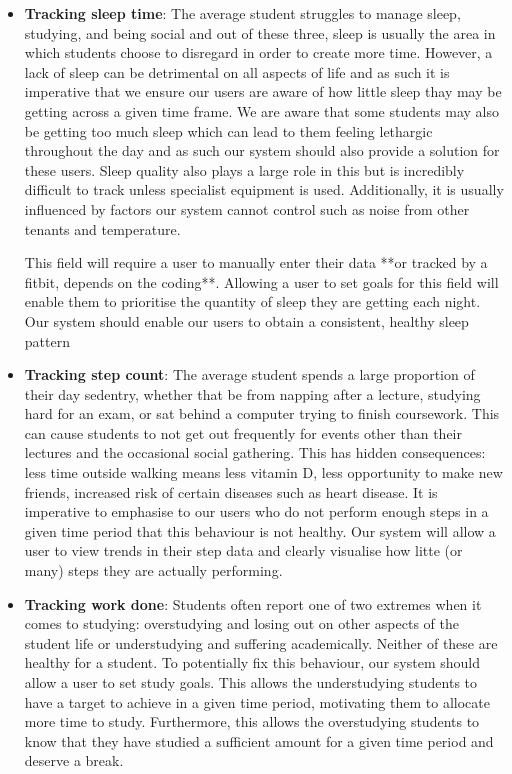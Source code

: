 \documentclass[12pt]{article}
\begin{document}
\begin{itemize}

    \item \textbf{Tracking sleep time}: The average student struggles to manage sleep, studying, and being social and out of these three, sleep is usually the area in which students choose to disregard in order to create more time. However, a lack of sleep can be detrimental on all aspects of life and as such it is imperative that we ensure our users are aware of how little sleep thay may be getting across a given time frame. We are aware that some students may also be getting too much sleep which can lead to them feeling lethargic throughout the day and as such our system should also provide a solution for these users. Sleep quality also plays a large role in this but is incredibly difficult to track unless specialist equipment is used. Additionally, it is usually influenced by factors our system cannot control such as noise from other tenants and temperature.

This field will require a user to manually enter their data **or tracked by a fitbit, depends on the coding**. Allowing a user to set goals for this field will enable them to prioritise the quantity of sleep they are getting each night. Our system should enable our users to obtain a consistent, healthy sleep pattern
    
    \item \textbf{Tracking step count}: The average student spends a large proportion of their day sedentry, whether that be from napping after a lecture, studying hard for an exam, or sat behind a computer trying to finish coursework. This can cause students to not get out frequently for events other than their lectures and the occasional social gathering. This has hidden consequences: less time outside walking means less vitamin D, less opportunity to make new friends, increased risk of certain diseases such as heart disease. It is imperative to emphasise to our users who do not perform enough steps in a given time period that this behaviour is not healthy. Our system will allow a user to view trends in their step data and clearly visualise how litte (or many) steps they are actually performing.

    \item \textbf{Tracking work done}: Students often report one of two extremes when it comes to studying: overstudying and losing out on other aspects of the student life or understudying and suffering academically. Neither of these are healthy for a student. To potentially fix this behaviour, our system should allow a user to set study goals. This allows the understudying students to have a target to achieve in a given time period, motivating them to allocate more time to study. Furthermore, this allows the overstudying students to know that they have studied a sufficient amount for a given time period and deserve a break.
    

\end{itemize}
\end{document}
